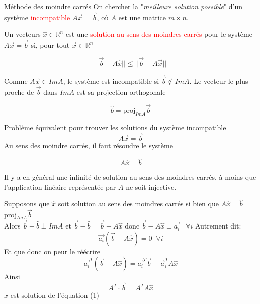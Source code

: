 \begin{parag}{Méthode des moindre carrés}
    On chercher la "\textit{meilleure solution possible}" d'un système \textcolor{red}{incompatible} $A\vec{x} = \vec{b}$, où $A$ est une matrice $m \times n$.
    \begin{definition}
        Un vecteurs $\hat{x} \in \mathbb{R}^n$ est une \textcolor{red}{solution au sens des moindres carrés} pour le système $A\vec{x} = \vec{b}$ si, pour tout $\vec{x} \in \mathbb{R}^n$
        \begin{formule}
            \[||\vec{b}-A\hat{x}|| \leq ||\vec{b} - A\vec{x}||\]
        \end{formule}
        
    \end{definition}
    Comme $A\vec{x} \in ImA$, le système est incompatible si $\vec{b} \notin ImA$. Le vecteur le plus proche de $\vec{b}$ dans $ImA$ est sa projection orthogonale
    \begin{formule}
        \[\hat{b} = \text{proj}_{ImA}\vec{b}\]
    \end{formule}
    \begin{subparag}{Problème équivalent}
        pour trouver les solutions  du système incompatible
        \[A\vec{x} = \vec{b}\]
        Au sens des moindre carrés, il faut résoudre le système
        \begin{formule}
            \[A\hat{x} = \hat{b}\]
        \end{formule}
        \begin{framedremark}
            Il y a en général une infinité de solution au sens des moindres carrés, à moins que l'application linéaire représentée par $A$ ne soit injective.
        \end{framedremark}
        Supposons que $\hat{x}$ soit solution au sens des moindres carrés si bien que $A\hat{x} = \hat{b} = $ proj$_{ImA}\vec{b}$
        \\
        Alors $\vec{b} - \hat{b} \perp ImA$ et $\vec{b} - \hat{b} = \vec{b} - A\hat{x}$ donc $\vec{b} - A\hat{x} \perp \vec{a_i} \; \; \; \forall i$ Autrement dit:
        \[\vec{a_i}(\vec{b} - A\hat{x}) = 0 \; \; \forall i\]
        Et que donc on peur le réécrire
        \[\vec{a_i}^T(\vec{b} - A\hat{x}) = \vec{a_i}^T\vec{b} - \vec{a}_i^TA\hat{x}\]
        Ainsi
        \begin{equation}
            A^T\cdot\vec{b} = A^TA\hat{x}
        \end{equation}
        $\hat{x}$ est solution de l'équation  (1) 
        
    \end{subparag}
\end{parag}
